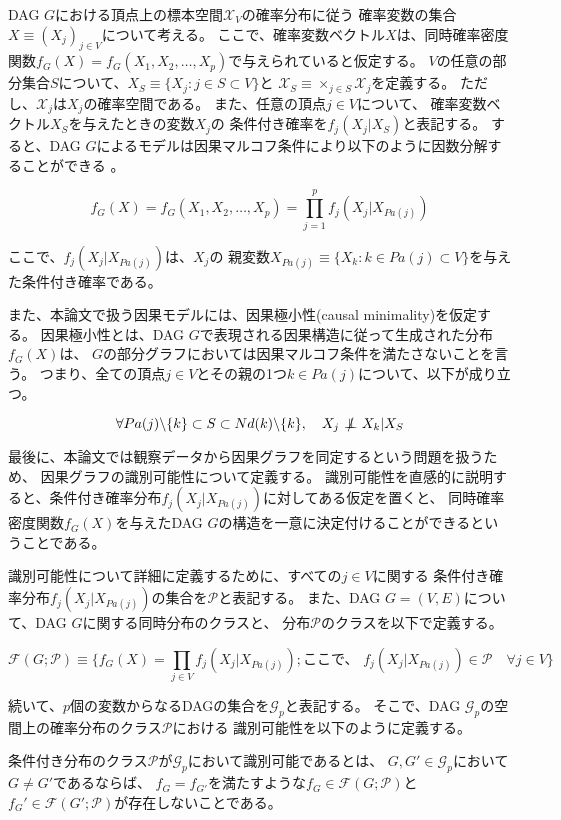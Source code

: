 DAG $G$における頂点上の標本空間$\mathcal X_V$の確率分布に従う
確率変数の集合$X \equiv (X_j)_{j \in V}$について考える。
ここで、確率変数ベクトル$X$は、同時確率密度関数$f_G(X)=f_G(X_1, X_2, \dots, X_p)$で与えられていると仮定する。
$V$の任意の部分集合$S$について、$X_S \equiv \{X_j:j\in S \subset V \}$と
$\mathcal X_S \equiv \times_{j \in S} \mathcal X_j$を定義する。
ただし、$\mathcal X_j$は$X_j$の確率空間である。
また、任意の頂点$j\in V$について、
確率変数ベクトル$X_S$を与えたときの変数$X_j$の
条件付き確率を$f_j(X_j|X_S)$と表記する。
すると、DAG $G$によるモデルは因果マルコフ条件により以下のように因数分解することができる
\cite{Pearl2009-oh}。

\begin{equation}
  f_G(X)=f_G(X_1, X_2, \dots, X_p) = \prod_{j=1}^p f_j(X_j | X_{Pa(j)})
  \label{eq:factorization}
\end{equation}

ここで、$f_j(X_j | X_{Pa(j)})$は、$X_j$の
親変数$X_{Pa(j)} \equiv \{ X_k:k\in Pa(j) \subset V \}$を与えた条件付き確率である。

また、本論文で扱う因果モデルには、因果極小性(causal minimality)を仮定する。
因果極小性とは、DAG $G$で表現される因果構造に従って生成された分布$f_G(X)$は、
$G$の部分グラフにおいては因果マルコフ条件を満たさないことを言う\cite{Zhang2011-da}。
つまり、全ての頂点$j \in V$とその親の1つ$k \in Pa(j)$について、以下が成り立つ。

\begin{equation}
  \forall Pa(j)\backslash\{k\} \subset S \subset Nd(k) \backslash\{k\},
  \quad X_j \notindep X_k | X_S
  \label{minimality}
\end{equation}

最後に、本論文では観察データから因果グラフを同定するという問題を扱うため、
因果グラフの識別可能性について定義する。
識別可能性を直感的に説明すると、条件付き確率分布$f_j(X_j|X_{Pa(j)})$に対してある仮定を置くと、
同時確率密度関数$f_G(X)$を与えたDAG $G$の構造を一意に決定付けることができるということである。

識別可能性について詳細に定義するために、すべての$j \in V$に関する
条件付き確率分布$f_j(X_j|X_{Pa(j)})$の集合を$\mathcal P$と表記する。
また、DAG $G=(V,E)$について、DAG $G$に関する同時分布のクラスと、
分布$\mathcal P$のクラスを以下で定義する。

\begin{equation}
  \mathcal F(G;\mathcal P) \equiv \{ f_G(X) = \prod_{j \in V} f_j(X_j|X_{Pa(j)}) ;
  \text{ここで、 } f_j(X_j|X_{Pa(j)}) \in \mathcal P \quad \forall j \in V \}
\end{equation}

続いて、$p$個の変数からなるDAGの集合を$\mathcal G_p$と表記する。
そこで、DAG $\mathcal G_p$の空間上の確率分布のクラス$\mathcal P$における
識別可能性を以下のように定義する。

\begin{df}[識別可能性]
  条件付き分布のクラス$\mathcal P$が$\mathcal G_p$において識別可能であるとは、
  $G,G' \in \mathcal G_p$において$G \neq G'$であるならば、
  $f_G = f_{G'}$を満たすような$f_G \in \mathcal F(G; \mathcal P)$と
  $f_G' \in \mathcal F(G'; \mathcal P)$が存在しないことである。
\end{df}
